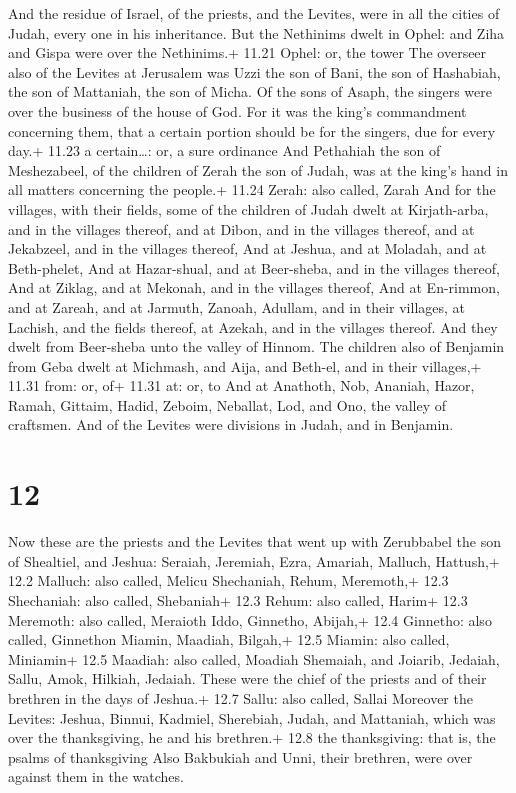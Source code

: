  And the residue of Israel, of the priests, and the
Levites, were in all the cities of Judah, every one in his inheritance.
 But the Nethinims dwelt in Ophel: and Ziha and Gispa were
over the Nethinims.+ 11.21 Ophel: or, the tower  The
overseer also of the Levites at Jerusalem was Uzzi the son of Bani, the
son of Hashabiah, the son of Mattaniah, the son of Micha. Of the sons of
Asaph, the singers were over the business of the house of God.
 For it was the king's commandment concerning them, that a
certain portion should be for the singers, due for every day.+ 11.23 a
certain\ldots: or, a sure ordinance  And Pethahiah the son
of Meshezabeel, of the children of Zerah the son of Judah, was at the
king's hand in all matters concerning the people.+ 11.24 Zerah: also
called, Zarah  And for the villages, with their fields,
some of the children of Judah dwelt at Kirjath-arba, and in the villages
thereof, and at Dibon, and in the villages thereof, and at Jekabzeel,
and in the villages thereof,  And at Jeshua, and at
Moladah, and at Beth-phelet,  And at Hazar-shual, and at
Beer-sheba, and in the villages thereof,  And at Ziklag,
and at Mekonah, and in the villages thereof,  And at
En-rimmon, and at Zareah, and at Jarmuth,  Zanoah, Adullam,
and in their villages, at Lachish, and the fields thereof, at Azekah,
and in the villages thereof. And they dwelt from Beer-sheba unto the
valley of Hinnom.  The children also of Benjamin from Geba
dwelt at Michmash, and Aija, and Beth-el, and in their villages,+ 11.31
from: or, of+ 11.31 at: or, to  And at Anathoth, Nob,
Ananiah,  Hazor, Ramah, Gittaim,  Hadid,
Zeboim, Neballat,  Lod, and Ono, the valley of craftsmen.
 And of the Levites were divisions in Judah, and in
Benjamin.

\hypertarget{section-11}{%
\section{12}\label{section-11}}

 Now these are the priests and the Levites that went up with
Zerubbabel the son of Shealtiel, and Jeshua: Seraiah, Jeremiah, Ezra,
 Amariah, Malluch, Hattush,+ 12.2 Malluch: also called,
Melicu  Shechaniah, Rehum, Meremoth,+ 12.3 Shechaniah: also
called, Shebaniah+ 12.3 Rehum: also called, Harim+ 12.3 Meremoth: also
called, Meraioth  Iddo, Ginnetho, Abijah,+ 12.4 Ginnetho:
also called, Ginnethon  Miamin, Maadiah, Bilgah,+ 12.5
Miamin: also called, Miniamin+ 12.5 Maadiah: also called, Moadiah
 Shemaiah, and Joiarib, Jedaiah,  Sallu, Amok,
Hilkiah, Jedaiah. These were the chief of the priests and of their
brethren in the days of Jeshua.+ 12.7 Sallu: also called, Sallai
 Moreover the Levites: Jeshua, Binnui, Kadmiel, Sherebiah,
Judah, and Mattaniah, which was over the thanksgiving, he and his
brethren.+ 12.8 the thanksgiving: that is, the psalms of thanksgiving
 Also Bakbukiah and Unni, their brethren, were over against
them in the watches.

